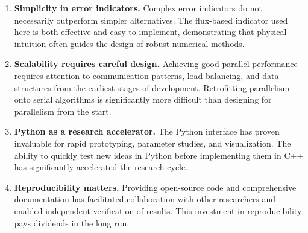 \begin{enumerate}
    \item \textbf{Simplicity in error indicators.} Complex error indicators do not necessarily outperform simpler alternatives. The flux-based indicator used here is both effective and easy to implement, demonstrating that physical intuition often guides the design of robust numerical methods.

    \item \textbf{Scalability requires careful design.} Achieving good parallel performance requires attention to communication patterns, load balancing, and data structures from the earliest stages of development. Retrofitting parallelism onto serial algorithms is significantly more difficult than designing for parallelism from the start.

    \item \textbf{Python as a research accelerator.} The Python interface has proven invaluable for rapid prototyping, parameter studies, and visualization. The ability to quickly test new ideas in Python before implementing them in C++ has significantly accelerated the research cycle.

    \item \textbf{Reproducibility matters.} Providing open-source code and comprehensive documentation has facilitated collaboration with other researchers and enabled independent verification of results. This investment in reproducibility pays dividends in the long run.
\end{enumerate}

